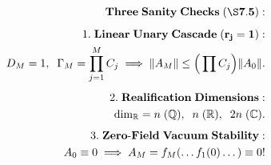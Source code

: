 \documentclass[preview]{standalone}
\begin{document}
\begin{align*}
\special{dvisvgm:raw <g id='unique000'>}\mathbf{Three\;Sanity\;Checks\;(\S 7.5):}\\[5pt]1.\;\mathbf{Linear\;Unary\;Cascade\;(r_j=1):}\\\;\;D_M = 1,\;\; \Gamma_M = \prod_{j=1}^M C_j \implies \|A_M\| \le \Big(\prod C_j\Big)\|A_0\|.\\[4pt]2.\;\mathbf{Realification\;Dimensions:}\\\;\;\dim_{\mathbb{R}} = n\;(\mathbb{Q}),\;\; n\;(\mathbb{R}),\;\; 2n\;(\mathbb{C}).\\[4pt]3.\;\mathbf{Zero\text{-}Field\;Vacuum\;Stability:}\\\;\;A_0 \equiv 0 \implies A_M = f_M(\dots f_1(0)\dots) \equiv 0!\special{dvisvgm:raw </g>}
\end{align*}
\end{document}

